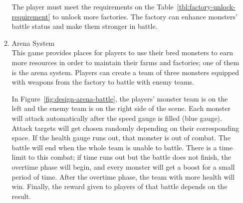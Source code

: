 \documentclass[12pt,oneside,openright,a4paper]{cpe-english-project}
\begin{document}
\begin{itemize}
\begin{enumerate}
	The player must meet the requirements on the Table~\ref{tbl:factory-unlock-requirement} to unlock more factories. The factory can enhance monsters' battle status and make them stronger in battle.

	\item Arena System \\
	This game provides places for players to use their bred monsters to earn more resources in order to maintain their farms and factories; one of them is the arena system. Players can create a team of three monsters equipped with weapons from the factory to battle with enemy teams.
	\begin{minipage}[c]{\textwidth}\centering
	\label{fig:design-arena-battle}
	\end{minipage}
	In Figure~\ref{fig:design-arena-battle}, the players' monster team is on the left and the enemy team is on the right side of the scene. Each monster will attack automatically after the speed gauge is filled (blue gauge). Attack targets will get chosen randomly depending on their corresponding space. If the health gauge runs out, that monster is out of combat. The battle will end when the whole team is unable to battle. There is a time limit to this combat; if time runs out but the battle does not finish, the overtime phase will begin, and every monster will get a boost for a small period of time. After the overtime phase, the team with more health will win. Finally, the reward given to players of that battle depends on the result.


\end{enumerate}
\end{itemize}
\end{document}
